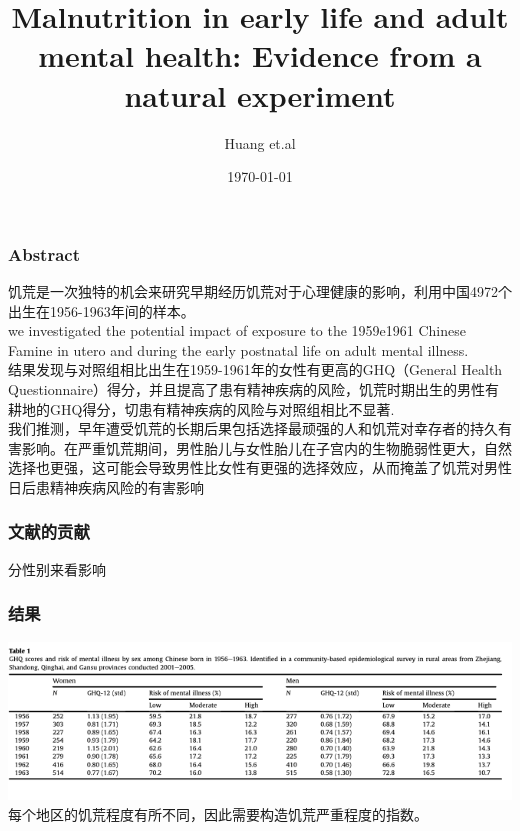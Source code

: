 \documentclass{beamer}
\title[文献分享:ZY]{Malnutrition in early life and adult mental health: Evidence from a natural experiment}
\author[Huang et.al]{Huang et.al}
\date{\today}
\begin{document}
\frame{\titlepage}



\begin{frame}
\frametitle{Abstract}
饥荒是一次独特的机会来研究早期经历饥荒对于心理健康的影响，利用中国4972个出生在1956-1963年间的样本。
\\ we investigated the potential impact of exposure to the 1959e1961 Chinese Famine in utero and during the early postnatal life on adult mental illness.
\\ 结果发现与对照组相比出生在1959-1961年的女性有更高的GHQ（General Health Questionnaire）得分，并且提高了患有精神疾病的风险，饥荒时期出生的男性有耕地的GHQ得分，切患有精神疾病的风险与对照组相比不显著.
\\ 我们推测，早年遭受饥荒的长期后果包括选择最顽强的人和饥荒对幸存者的持久有害影响。在严重饥荒期间，男性胎儿与女性胎儿在子宫内的生物脆弱性更大，自然选择也更强，这可能会导致男性比女性有更强的选择效应，从而掩盖了饥荒对男性日后患精神疾病风险的有害影响

\end{frame}

\begin{frame}
\frametitle{文献的贡献}
	分性别来看影响
\end{frame}


\begin{frame}
\frametitle{结果}
\includegraphics[scale=0.5]{table1}
每个地区的饥荒程度有所不同，因此需要构造饥荒严重程度的指数。
\end{frame}
\end{document}
